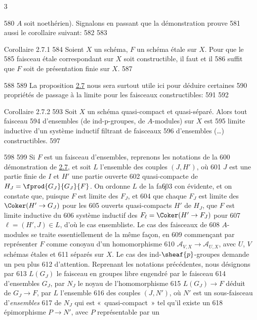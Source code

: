 3	\documentclass[10pt]{../fichiers-configuration-latex/smfart}
\begin{document}
   580	$A$ soit noethérien). Signalons en passant que la démonstration prouve
   581	aussi le corollaire suivant:
   582	
   583	\begin{enonce*}{Corollaire 2.7.1}
   584	Soient $X$ un schéma, $F$ un schéma étale sur $X$. Pour que le
   585	faisceau étale correspondant sur $X$ soit constructible, il faut et il
   586	suffit que $F$ soit de présentation finie sur $X$.
   587	\end{enonce*}
   588	
   589	La proposition \hyperref[IX.prop2.7]{2.7} nous sera surtout utile ici pour déduire certaines
   590	propriétés de passage à la limite pour les faisceaux constructibles:
   591	
   592	\begin{enonce*}{Corollaire 2.7.2}
   593	Soit $X$ un schéma quasi-compact et quasi-séparé. Alors tout faisceau
   594	d'ensembles (\resp de ind-p-groupes, \resp de $A$-modules) sur $X$ est
   595	limite inductive d'un système inductif filtrant de faisceaux
   596	d'ensembles (\resp\ldots) constructibles.
   597	\end{enonce*}
   598	
   599	Si $F$ est un faisceau d'ensembles, reprenons les notations de la
   600	démonstration de \hyperref[IX.prop2.7]{2.7}, et soit $L$ l'ensemble des couples $(J,H')$, où
   601	$J$ est une partie finie de $I$ et $H'$ une partie ouverte
   602	quasi-compacte de $H_J=\fprod{G_J}{G_J}{F}$. On ordonne $L$ de la fa\c
   603	con évidente, et on constate que, puisque $F$ est limite des $F_J$, et
   604	que chaque $F_J$ est limite des $\Coker(H'\rightarrow G_J)$ pour les
   605	ouverts quasi-compacts $H'$ de $H_J$, que $F$ est limite inductive du
   606	système inductif des $F_{\ell}=\Coker(H'\rightarrow F_J)$ pour
   607	$\ell=(H',J)\in L$, d'où le cas ensembliste. Le cas des faisceaux de
   608	$A$-modules se traite essentiellement de la même façon, en
   609	commençant par représenter $F$ comme conoyau d'un homomorphisme
   610	$𝒜_{V,X}\rightarrow 𝒜_{U,X}$, avec $U$, $V$ schémas étales et
   611	séparés sur $X$. Le cas des ind-$\sheaf{p}$-groupes demande un peu plus
   612	d'attention. Reprenant les notations précédentes, nous désignons par
   613	$L(G_J)$ le faisceau en groupes libre engendré par le faisceau
   614	d'ensembles $G_J$, par $N_J$ le noyau de l'homomorphisme
   615	$L(G_J)\rightarrow F$ déduit de $G_J\rightarrow F$, par $L$ l'ensemble
   616	des couples $(J,N')$, où $N'$ est un sous-faisceau d'\emph{ensembles}
   617	de $N_J$ qui est « quasi-compact » \ie tel qu'il existe un
   618	épimorphisme $P\rightarrow N'$, avec $P$ représentable par un
\end{document}
